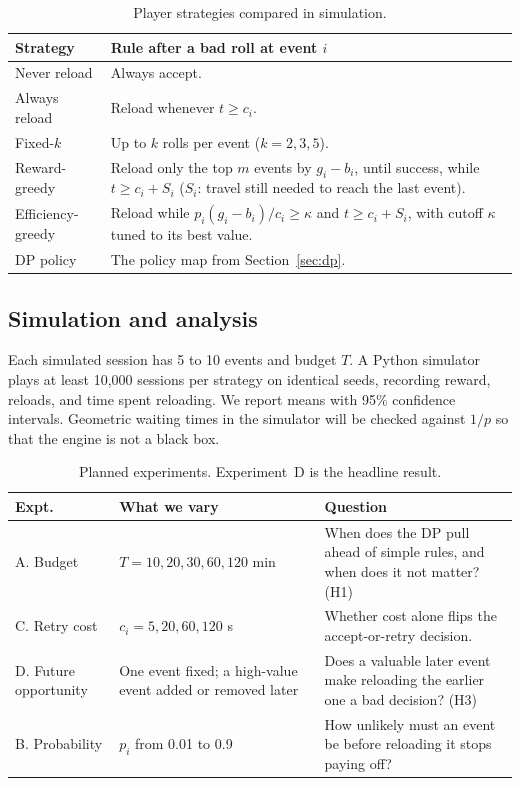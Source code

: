 \documentclass[11pt,a4paper]{article}
\begin{document}
\begin{table}[H]
\centering
\caption{Player strategies compared in simulation.}
\renewcommand{\arraystretch}{1.08}
\begin{tabularx}{\textwidth}{@{}>{\raggedright\arraybackslash}p{2.8cm} X@{}}
\toprule
\textbf{Strategy} & \textbf{Rule after a bad roll at event \(i\)} \\
\midrule
Never reload & Always accept. \\
Always reload & Reload whenever \(t \ge c_i\). \\
Fixed-\(k\) & Up to \(k\) rolls per event (\(k = 2,3,5\)). \\
Reward-greedy & Reload only the top \(m\) events by \(g_i-b_i\), until success, while \(t \ge c_i + S_i\) (\(S_i\): travel still needed to reach the last event). \\
Efficiency-greedy & Reload while \(p_i(g_i-b_i)/c_i \ge \kappa\) and \(t \ge c_i + S_i\), with cutoff \(\kappa\) tuned to its best value. \\
DP policy & The policy map from Section~\ref{sec:dp}. \\
\bottomrule
\end{tabularx}
\end{table}

\subsection{Simulation and analysis}
Each simulated session has 5 to 10 events and budget \(T\). A Python simulator plays at least 10{,}000 sessions per strategy on identical seeds, recording reward, reloads, and time spent reloading. We report means with 95\% confidence intervals. Geometric waiting times in the simulator will be checked against \(1/p\) so that the engine is not a black box.

\begin{table}[H]
\centering
\caption{Planned experiments. Experiment~D is the headline result.}
\renewcommand{\arraystretch}{1.08}
\begin{tabularx}{\textwidth}{@{}l >{\raggedright\arraybackslash}p{4.4cm} X@{}}
\toprule
\textbf{Expt.} & \textbf{What we vary} & \textbf{Question} \\
\midrule
A. Budget & \(T = 10,20,30,60,120\) min & When does the DP pull ahead of simple rules, and when does it not matter? (H1) \\
C. Retry cost & \(c_i = 5,20,60,120\) s & Whether cost alone flips the accept-or-retry decision. \\
D. Future opportunity & One event fixed; a high-value event added or removed later & Does a valuable later event make reloading the earlier one a bad decision? (H3) \\
B. Probability & \(p_i\) from 0.01 to 0.9 & How unlikely must an event be before reloading it stops paying off? \\
\bottomrule
\end{tabularx}
\end{table}
\end{document}
